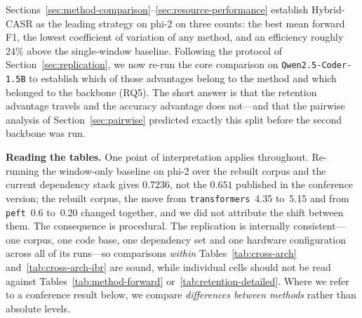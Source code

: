\noindent
Sections~\ref{sec:method-comparison}--\ref{sec:resource-performance} establish Hybrid-CASR as the leading strategy on phi-2 on three counts: the best mean forward F1, the lowest coefficient of variation of any method, and an efficiency roughly $24\%$ above the single-window baseline. Following the protocol of Section~\ref{sec:replication}, we now re-run the core comparison on \texttt{Qwen2.5-Coder-1.5B} to establish which of those advantages belong to the method and which belonged to the backbone (RQ5). The short answer is that the retention advantage travels and the accuracy advantage does not---and that the pairwise analysis of Section~\ref{sec:pairwise} predicted exactly this split before the second backbone was run.

\textbf{Reading the tables.} One point of interpretation applies throughout. Re-running the window-only baseline on phi-2 over the rebuilt corpus and the current dependency stack gives $0.7236$, not the $0.651$ published in the conference version; the rebuilt corpus, the move from \texttt{transformers}~4.35 to~5.15 and from \texttt{peft}~0.6 to~0.20 changed together, and we did not attribute the shift between them. The consequence is procedural. The replication is internally consistent---one corpus, one code base, one dependency set and one hardware configuration across all of its runs---so comparisons \emph{within} Tables~\ref{tab:cross-arch} and~\ref{tab:cross-arch-ibr} are sound, while individual cells should not be read against Tables~\ref{tab:method-forward} or~\ref{tab:retention-detailed}. Where we refer to a conference result below, we compare \emph{differences between methods} rather than absolute levels.

